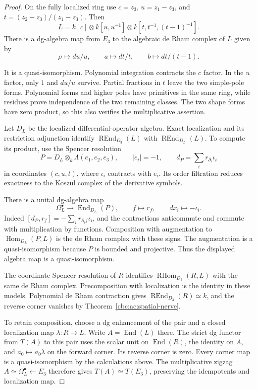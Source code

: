 \begin{proof}
On the fully localized ring use
$c=z_3$, $u=z_1-z_3$, and
$t=(z_2-z_3)/(z_1-z_3)$. Then
\[
 L=k[c]\otimes k[u,u^{-1}]
          \otimes k[t,t^{-1},(t-1)^{-1}].
\]
There is a dg-algebra map from $E_3$ to
the algebraic de Rham complex of $L$ given by
\[
 \rho\longmapsto du/u,\qquad
 a\longmapsto dt/t,\qquad
 b\longmapsto dt/(t-1).
\]

It is a quasi-isomorphism. Polynomial integration
contracts the $c$ factor. In the $u$ factor,
only $1$ and $du/u$ survive. Partial fractions
in $t$ leave the two simple-pole forms.
Polynomial forms and higher poles have
primitives in the same ring, while residues
prove independence of the two remaining classes.
The two shape forms have zero product, so this
also verifies the multiplicative assertion.

Let $D_L$ be the localized differential-operator
algebra. Exact localization and its restriction
adjunction identify
$\operatorname{REnd}_{D_3}(L)$ with
$\operatorname{REnd}_{D_L}(L)$.
To compute its product, use the Spencer resolution
\[
 P=D_L\otimes_k\Lambda(e_1,e_2,e_3),\qquad
 |e_i|=-1,\qquad
 d_P=\sum_i r_{\partial_i}\iota_i
\]
in coordinates $(c,u,t)$, where $\iota_i$
contracts with $e_i$. Its order filtration
reduces exactness to the Koszul complex of
the derivative symbols.

There is a unital dg-algebra map
\[
 \Omega_L^\bullet\longrightarrow
                       \operatorname{End}_{D_L}(P),
 \qquad f\longmapsto r_f,\qquad dx_i\longmapsto-\iota_i.
\]
Indeed
$[d_P,r_f]=-\sum_i r_{\partial_i f}\iota_i$,
and the contractions anticommute and commute
with multiplication by functions.
Composition with augmentation to
$\operatorname{Hom}_{D_L}(P,L)$ is the de Rham
complex with these signs. The augmentation is
a quasi-isomorphism because $P$ is bounded
and projective. Thus the displayed algebra
map is a quasi-isomorphism.

The coordinate Spencer resolution of $R$
identifies $\operatorname{RHom}_{D_3}(R,L)$
with the same de Rham complex. Precomposition
with localization is the identity in these
models. Polynomial de Rham contraction gives
$\operatorname{REnd}_{D_3}(R)\simeq k$, and
the reverse corner vanishes by
Theorem~\ref{cbc:ac:spatial-nerve}.

To retain composition, choose a dg enhancement
of the pair and a closed localization map
$\lambda:R\to L$. Write $A=\operatorname{End}(L)$
there. The strict dg functor from $T(A)$
to this pair uses the scalar unit on
$\operatorname{End}(R)$, the identity on $A$,
and $a_0\mapsto a_0\lambda$ on the forward
corner. Its reverse corner is zero.
Every corner map is a quasi-isomorphism by
the calculations above. The multiplicative
zigzag $A\simeq\Omega_L^\bullet\leftarrow E_3$
therefore gives $T(A)\simeq T(E_3)$, preserving
the idempotents and localization map.
\end{proof}

